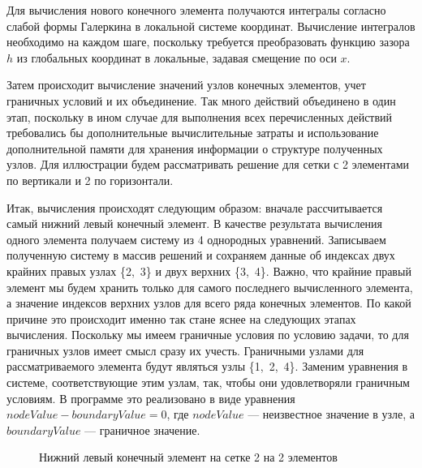 \documentclass[a4paper,14pt]{extarticle}
\begin{document}
Для вычисления нового конечного элемента получаются интегралы согласно слабой формы Галеркина в локальной системе координат. Вычисление интегралов необходимо на каждом шаге, поскольку требуется преобразовать функцию зазора $h$ из глобальных координат в локальные, задавая смещение по оси $x$.

Затем происходит вычисление значений узлов конечных элементов, учет граничных условий и их объединение. Так много действий объединено в один этап, поскольку в ином случае для выполнения всех перечисленных действий требовались бы дополнительные вычислительные затраты и использование дополнительной памяти для хранения информации о структуре полученных узлов. Для иллюстрации будем рассматривать решение для сетки с 2 элементами по вертикали и 2 по горизонтали.

Итак, вычисления происходят следующим образом: вначале рассчитывается самый нижний левый конечный элемент. В качестве результата вычисления одного элемента получаем систему из 4 однородных уравнений. Записываем полученную систему в массив решений и сохраняем данные об индексах двух крайних правых узлах \{2,~3\} и двух верхних \{3,~4\}. Важно, что крайние правый элемент мы будем хранить только для самого последнего вычисленного элемента, а значение индексов верхних узлов для всего ряда конечных элементов. По какой причине это происходит именно так стане яснее на следующих этапах вычисления. Поскольку мы имеем граничные условия по условию задачи, то для граничных узлов имеет смысл сразу их учесть. Граничными узлами для рассматриваемого элемента будут являться узлы \{1,~2,~4\}. Заменим уравнения в системе, соответствующие этим узлам, так, чтобы они удовлетворяли граничным условиям. В программе это реализовано в виде уравнения $nodeValue - boundaryValue = 0$, где $nodeValue$ --- неизвестное значение в узле, а $boundaryValue$ --- граничное значение. 
\begin{figure}[!htbp]
	\caption{Нижний левый конечный элемент на сетке 2 на 2 элементов}
	\label{left-bottom-el}
\end{figure}
\end{document}
